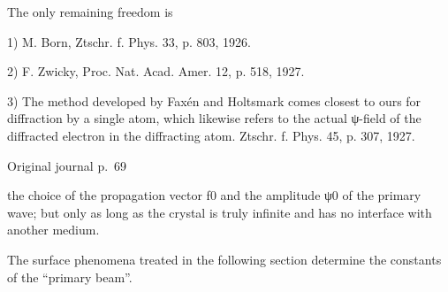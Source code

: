 \documentclass[10pt]{article}
\newcommand{\origpage}[1]{\par\medskip\noindent\hfill{\small\color{notegray}Original journal p.~#1}\hfill\mbox{}\par\smallskip}
\begin{document}
The only remaining freedom is\par
\noindent\footnotesize 1) M. Born, Ztschr. f. Phys. 33, p. 803, 1926.\par\normalsize
\noindent\footnotesize 2) F. Zwicky, Proc. Nat. Acad. Amer. 12, p. 518, 1927.\par\normalsize
\noindent\footnotesize 3) The method developed by Faxén and Holtsmark comes closest to ours for diffraction by a single atom, which likewise refers to the actual ψ-field of the diffracted electron in the diffracting atom. Ztschr. f. Phys. 45, p. 307, 1927.\par\normalsize
\origpage{69}
the choice of the propagation vector f0 and the amplitude ψ0 of the primary wave; but only as long as the crystal is truly infinite and has no interface with another medium.\par
The surface phenomena treated in the following section determine the constants of the “primary beam”.\par
\end{document}
